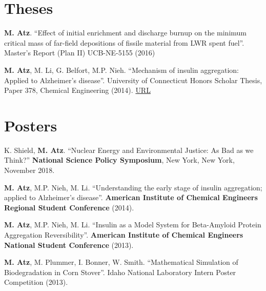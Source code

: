 \documentclass[margin,line]{resume}
\begin{document}
\begin{resume}
\section{\mysidestyle Theses\\}
\begin{bibenum}

    \item \textbf{M. Atz}. ``Effect of initial enrichment and discharge burnup on the minimum critical mass of far-field depositions of fissile material from LWR spent fuel''. Master's Report (Plan II) UCB-NE-5155 (2016)

    \item \textbf{M. Atz}, M. Li, G. Belfort, M.P. Nieh. ``Mechanism of insulin aggregation: Applied to Alzheimer’s disease''. University of Connecticut Honors Scholar Thesis, Paper 378, Chemical Engineering (2014). \href{https://opencommons.uconn.edu/cgi/viewcontent.cgi?referer=&httpsredir=1&article=1386&context=srhonors_theses}{URL} 
    
\end{bibenum}
\section{\mysidestyle Posters}
\begin{bibenum}

    \item K. Shield, \textbf{M. Atz}. ``Nuclear Energy and Environmental Justice: As Bad as we Think?'' \textbf{National Science Policy Symposium}, New York, New York, November 2018.
    
    \item \textbf{M. Atz}, M.P. Nieh, M. Li. ``Understanding the early stage of insulin aggregation; applied to Alzheimer’s disease''. \textbf{American Institute of Chemical Engineers Regional Student Conference} (2014).

    \item \textbf{M. Atz}, M.P. Nieh, M. Li. ``Insulin as a Model System for Beta-Amyloid Protein Aggregation Reversibility''. \textbf{American Institute of Chemical Engineers National Student Conference} (2013).

    \item \textbf{M. Atz}, M. Plummer, I. Bonner, W. Smith. ``Mathematical Simulation of Biodegradation in Corn Stover''. Idaho National Laboratory Intern Poster Competition (2013).


\end{bibenum}
\end{resume}
\end{document}
